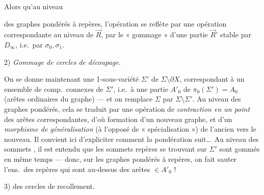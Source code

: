 \documentclass[11pt,a4paper]{article}
\begin{document}
Alors qu'au niveau

%

des graphes pondérés à repères, l'opération  se reflète
par une opération correspondante au niveau de $\vec{R}$, par le « gommage »
d'une partie $\vec{R}'$ stable par $D_{\infty}$, i.e.\ par $\sigma_0,
\sigma_1$.

2) \emph{Gommage de cercles de découpage.}

On se donne maintenant une 
 1-sous-variété $\Sigma'$ de $\Sigma \setminus
\partial X$, correspondant à un
ensemble \struck{\ill{}} de comp.\ connexes de $\Sigma'$, i.e.\ à une partie
$A'_0$ de $\pi_0(\Sigma') = A_0$ (arêtes ordinaires du graphe) ---
et on remplace $\Sigma$ par $\Sigma \setminus \Sigma'$. Au niveau des
graphes pondérés, cela se traduit par une opération de \emph{contraction en
un point} des arêtes correspondantes, d'où formation d'un nouveau graphe, et
d'un \emph{morphisme de généralisation} (à l'opposé de « spécialisation »)
de l'ancien vers le nouveau. Il convient ici d'expliciter comment la
pondération suit\ldots\ Au niveau des sommets , il est
entendu que les sommets repères se trouvant sur $\Sigma'$ sont gommés en
même temps --- donc, sur les graphes pondérés à repères, on fait sauter
l'ens.\ des repères qui sont au-dessus des arêtes $\in A'_0$ !

3)   des cercles de
recollement.
\end{document}
